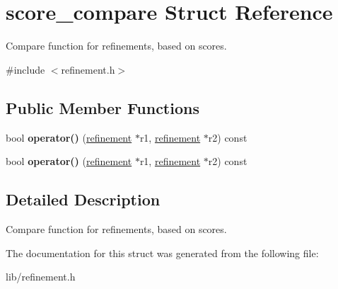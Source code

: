 \hypertarget{structscore__compare}{}\section{score\+\_\+compare Struct Reference}
\label{structscore__compare}


Compare function for refinements, based on scores.  




{\ttfamily \#include $<$refinement.\+h$>$}

\subsection*{Public Member Functions}
\begin{DoxyCompactItemize}
\item 
bool {\bfseries operator()} (\hyperlink{classrefinement}{refinement} $\ast$r1, \hyperlink{classrefinement}{refinement} $\ast$r2) const \hypertarget{structscore__compare_a661973d33cfceb1dee63464cf2173f30}{}\label{structscore__compare_a661973d33cfceb1dee63464cf2173f30}

\item 
bool {\bfseries operator()} (\hyperlink{classrefinement}{refinement} $\ast$r1, \hyperlink{classrefinement}{refinement} $\ast$r2) const \hypertarget{structscore__compare_a661973d33cfceb1dee63464cf2173f30}{}\label{structscore__compare_a661973d33cfceb1dee63464cf2173f30}

\end{DoxyCompactItemize}


\subsection{Detailed Description}
Compare function for refinements, based on scores. 

The documentation for this struct was generated from the following file\+:\begin{DoxyCompactItemize}
\item 
lib/refinement.\+h\end{DoxyCompactItemize}
